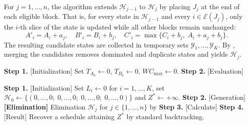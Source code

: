\documentclass[12pt]{article}
\begin{document}
\begin{sloppypar}
For $j = 1,\dots,n$, the algorithm extends $\mathscr{H}_{j-1}$ to $\mathscr{H}_j$ by placing $J_j$
at the end of each eligible block. That is, for every state in $\mathscr{H}_{j-1}$ and every
$i \in \mathcal{E}(J_j)$, only the $i$-th slice of the state is updated while all other blocks
remain unchanged:
\begin{equation}\label{eq:transition}
A'_i = A_i + a_j,\quad
B'_i = B_i + b_j,\quad
C'_i = \max\{C_i + b_j,\; A_i + a_j + b_j\}.
\end{equation}
The resulting candidate states are collected in temporary sets $\mathcal{Y}_1,\dots,\mathcal{Y}_K$.
By , merging the candidates removes dominated and duplicate
states and yields $\mathscr{H}_{j}$.

\begin{algorithm}[tbp]
\small
\linespread{1.2}\selectfont
\SetAlgoLined
\DontPrintSemicolon
\caption{Block concatenation and evaluation}\label{alg:Block-concat}
\BlankLine
\textbf{Step 1.} [Initialization] Set $T_{A_0}\gets 0$, $T_{B_0}\gets 0$, $W C_{\max}\gets 0$. \;
\textbf{Step 2.} [Evaluation] 
\end{algorithm}

\begin{algorithm}[tbp]
\small
\linespread{1.2}\selectfont
\SetAlgoLined
\DontPrintSemicolon
\caption{DP for $F2 \parallel W C_{\max}$}\label{alg:dp}
\BlankLine
\textbf{Step 1.} [Initialization] Set $L_i\gets 0$ for $i=1,\dots,K$, set
	$\mathscr{H}_0\gets\{(0,\dots,0; \; 0,\dots,0; \; 0,\dots,0; \; 0,\dots,0)\}$ and $Z^{*}\gets+\infty$. \;
\textbf{Step 2.} [Generation] 
\textbf{[Elimination]} Elimination $\mathscr{H}_j$ for $j \in \{1,\dots,n\}$ by  \;
\textbf{Step 3.} [Calculate] 
\textbf{Step 4.} [Result] Recover a schedule attaining $Z^{*}$ by standard backtracking. \;
\end{algorithm}


\end{sloppypar}
\end{document}
